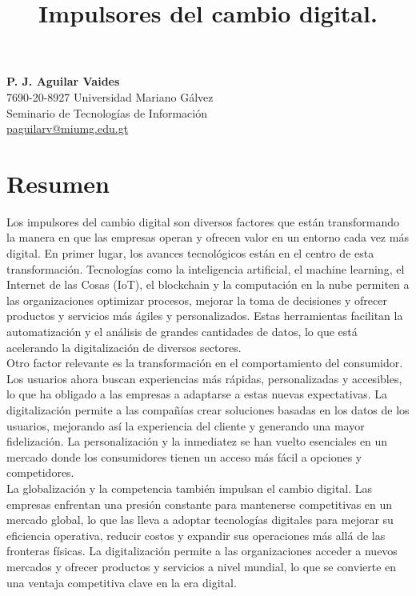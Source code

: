 \documentclass{article}
\title{\vspace{-2cm}\large\textbf{Impulsores del cambio digital.}}
\author{}
\date{\vspace{-2.2cm}}
\begin{document}
\maketitle

\begin{center}
    \textbf{P. J. Aguilar Vaides} \\
    7690-20-8927 Universidad Mariano Gálvez \\
    Seminario de Tecnologías de Información \\
    \href{mailto:jperez@gmail.com}{paguilarv@miumg.edu.gt}
\end{center}

\section{Resumen}

Los impulsores del cambio digital son diversos factores que están transformando la manera en que las empresas operan y ofrecen valor en un entorno cada vez más digital. En primer lugar, los avances tecnológicos están en el centro de esta transformación. Tecnologías como la inteligencia artificial, el machine learning, el Internet de las Cosas (IoT), el blockchain y la computación en la nube permiten a las organizaciones optimizar procesos, mejorar la toma de decisiones y ofrecer productos y servicios más ágiles y personalizados. Estas herramientas facilitan la automatización y el análisis de grandes cantidades de datos, lo que está acelerando la digitalización de diversos sectores.\\

Otro factor relevante es la transformación en el comportamiento del consumidor. Los usuarios ahora buscan experiencias más rápidas, personalizadas y accesibles, lo que ha obligado a las empresas a adaptarse a estas nuevas expectativas. La digitalización permite a las compañías crear soluciones basadas en los datos de los usuarios, mejorando así la experiencia del cliente y generando una mayor fidelización. La personalización y la inmediatez se han vuelto esenciales en un mercado donde los consumidores tienen un acceso más fácil a opciones y competidores.\\

La globalización y la competencia también impulsan el cambio digital. Las empresas enfrentan una presión constante para mantenerse competitivas en un mercado global, lo que las lleva a adoptar tecnologías digitales para mejorar su eficiencia operativa, reducir costos y expandir sus operaciones más allá de las fronteras físicas. La digitalización permite a las organizaciones acceder a nuevos mercados y ofrecer productos y servicios a nivel mundial, lo que se convierte en una ventaja competitiva clave en la era digital.\\
\end{document}
